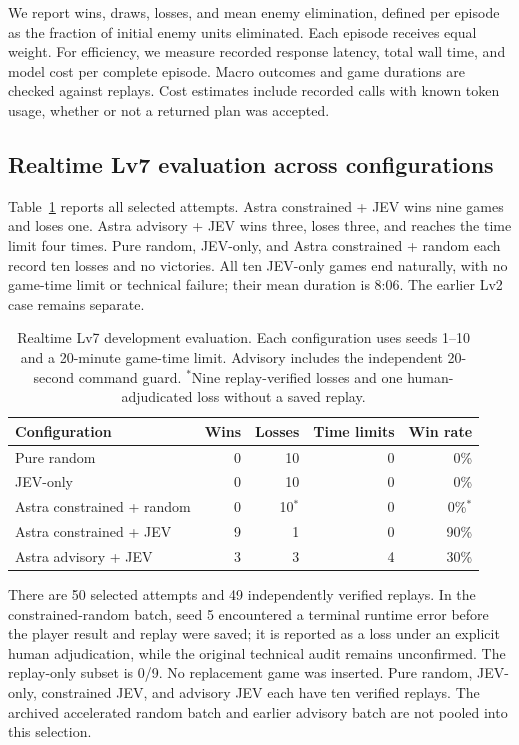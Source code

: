 \documentclass{article}
\newcommand{\captionbelowtable}{\normalsize\setlength{\abovecaptionskip}{7pt}\setlength{\belowcaptionskip}{0pt}}
\begin{document}
We report wins, draws, losses, and mean enemy elimination, defined per episode as the fraction of initial enemy units eliminated. Each episode receives equal weight. For efficiency, we measure recorded response latency, total wall time, and model cost per complete episode. Macro outcomes and game durations are checked against replays. Cost estimates include recorded calls with known token usage, whether or not a returned plan was accepted.

\subsection{Realtime Lv7 evaluation across configurations}
\label{sec:lv7}

Table~\ref{tab:macroconfigs} reports all selected attempts. Astra constrained + JEV wins nine games and loses one. Astra advisory + JEV wins three, loses three, and reaches the time limit four times. Pure random, JEV-only, and Astra constrained + random each record ten losses and no victories. All ten JEV-only games end naturally, with no game-time limit or technical failure; their mean duration is 8:06. The earlier Lv2 case remains separate.

\begin{table}[t]
\centering\small
\begin{tabular}{lrrrr}
\toprule
Configuration & Wins & Losses & Time limits & Win rate \\
\midrule
Pure random & 0 & 10 & 0 & 0\% \\
JEV-only & 0 & 10 & 0 & 0\% \\
Astra constrained + random & 0 & 10$^{*}$ & 0 & 0\%$^{*}$ \\
Astra constrained + JEV & 9 & 1 & 0 & 90\% \\
Astra advisory + JEV & 3 & 3 & 4 & 30\% \\
\bottomrule
\end{tabular}
\captionbelowtable
\caption{Realtime Lv7 development evaluation. Each configuration uses seeds 1--10 and a 20-minute game-time limit. Advisory includes the independent 20-second command guard. $^{*}$Nine replay-verified losses and one human-adjudicated loss without a saved replay.}
\label{tab:macroconfigs}
\end{table}

There are 50 selected attempts and 49 independently verified replays. In the constrained-random batch, seed 5 encountered a terminal runtime error before the player result and replay were saved; it is reported as a loss under an explicit human adjudication, while the original technical audit remains unconfirmed. The replay-only subset is 0/9. No replacement game was inserted. Pure random, JEV-only, constrained JEV, and advisory JEV each have ten verified replays. The archived accelerated random batch and earlier advisory batch are not pooled into this selection.
\end{document}
